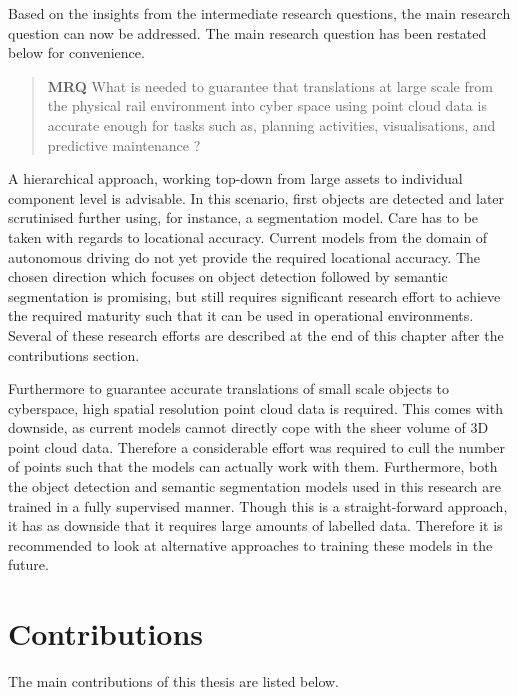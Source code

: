 Based on the insights from the intermediate research questions, the main research question can now be addressed. The main research question has been restated below for convenience.
\begin{quote}
    \textbf{MRQ} What is needed to guarantee that translations at large scale from the physical rail environment into cyber space using point cloud data is accurate enough for tasks such as, planning activities, visualisations, and predictive maintenance ?
\end{quote}
A hierarchical approach, working top-down from large assets to individual component level is advisable. In this scenario, first objects are detected and later scrutinised further using, for instance, a segmentation model. Care has to be taken with regards to locational accuracy. Current models from the domain of autonomous driving do not yet provide the required locational accuracy. The chosen direction which focuses on object detection followed by semantic segmentation is promising, but still requires significant research effort to achieve the required maturity such that it can be used in operational environments. Several of these research efforts are described at the end of this chapter after the contributions section.

Furthermore to guarantee accurate translations of small scale objects to cyberspace, high spatial resolution point cloud data is required. This comes with downside, as current models cannot directly cope with the sheer volume of 3D point cloud data. Therefore a considerable effort was required to cull the number of points such that the models can actually work with them. Furthermore, both the object detection and semantic segmentation models used in this research are trained in a fully supervised manner. Though this is a straight-forward approach, it has as downside that it requires large amounts of labelled data. Therefore it is recommended to look at alternative approaches to training these models in the future.

\section{Contributions}
The main contributions of this thesis are listed below. 

